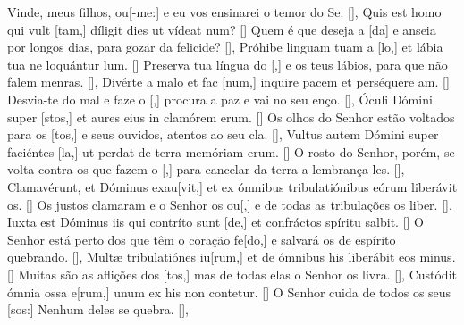{    {Vinde, meus filhos, ou[-me:] e eu vos ensinarei o temor do Se. [\LinkPT]},
  {Quis est homo qui vult [tam,] díligit dies ut vídeat \-num? [\LinkLA]}%
    {Quem é que deseja a [da] e anseia por longos dias, para gozar da felicide? [\LinkPT]},
  {Próhibe linguam tuam a [lo,] et lábia tua ne lo\-quántur \-lum. [\LinkLA]}%
    {Preserva tua língua do [,] e os teus lábios, para que não falem menras. [\LinkPT]},
  {Divérte a malo et fac [num,] inquire pacem et perséquere am. [\LinkLA]}%
    {Desvia-te do mal e faze o [,] procura a paz e vai no seu enço. [\LinkPT]},
  {Óculi Dómini super [stos,] et aures eius in clamórem erum. [\LinkLA]}%
    {Os olhos do Senhor estão voltados para os [tos,] e seus ouvidos, atentos ao seu cla. [\LinkPT]},
  {Vultus autem Dómini super faciéntes [la,] ut perdat de ter\-ra memóriam erum. [\LinkLA]}%
    {O rosto do Senhor, porém, se volta contra os que fazem o [,] para cancelar da terra a lembrança les. [\LinkPT]},
  {Clamavérunt, et Dóminus exau[vit,] et ex ómnibus tribulatiónibus eórum liberávit os. [\LinkLA]}%
    {Os justos clamaram e o Senhor os ou[,] e de todas as tribulações os liber. [\LinkPT]},
  {Iuxta est Dóminus iis qui contríto sunt [de,] et confráctos spíritu salbit. [\LinkLA]}%
    {O Senhor está perto dos que têm o coração fe[do,] e salvará os de espírito quebrando. [\LinkPT]},
  {Multæ tribulatiónes iu[rum,] et de ómnibus his liberábit eos minus. [\LinkLA]}%
    {Muitas são as aflições dos [tos,] mas de todas elas o Senhor os livra. [\LinkPT]},
  {Custódit ómnia ossa e[rum,] unum ex his non contetur. [\LinkLA]}%
    {O Senhor cuida de todos os seus [sos:] Nenhum deles se quebra. [\LinkPT]},
}
